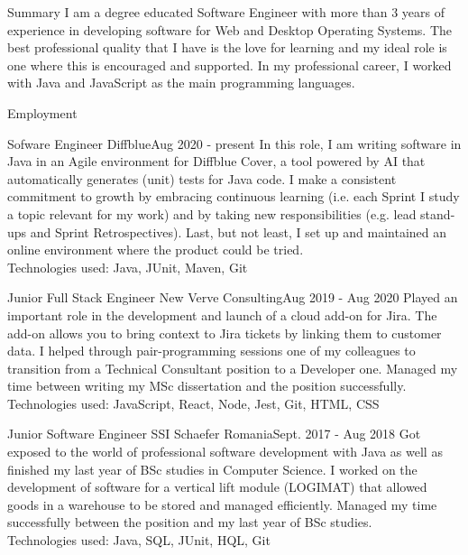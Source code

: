 \documentclass[]{mcdowellcv}
\begin{document}
	\makeheader

  \begin{cvsection}{Summary}
    I am a degree educated Software Engineer with more than 3 years of experience in developing software for Web and Desktop Operating Systems. The best professional quality that I have is the love for learning and my ideal role is one where this is encouraged and supported. In my professional career, I worked with Java and JavaScript as the main programming languages.
  \end{cvsection}

  \begin{cvsection}{Employment}
    \begin{cvsubsection}{Sofware Engineer }{Diffblue}{Aug 2020 - present}
      In this role, I am writing software in Java in an Agile environment for Diffblue Cover, a tool powered by AI that automatically generates (unit) tests for Java code. I make a consistent commitment to growth by embracing continuous learning (i.e. each Sprint I study a topic relevant for my work) and by taking new responsibilities (e.g. lead stand-ups and Sprint Retrospectives). Last, but not least, I set up and maintained an online environment where the product could be tried.
      \\Technologies used: Java, JUnit, Maven, Git
		\end{cvsubsection}

		\begin{cvsubsection}{Junior Full Stack Engineer }{New Verve Consulting}{Aug 2019 - Aug 2020}
      Played an important role in the development and launch of a cloud add-on for Jira. The add-on allows you to bring context to Jira tickets by linking them to customer data. I helped through pair-programming sessions one of my colleagues to transition from a Technical Consultant position to a Developer one. Managed my time between writing my MSc dissertation and the position successfully.
      \\Technologies used: JavaScript, React, Node, Jest, Git, HTML, CSS
		\end{cvsubsection}

		\begin{cvsubsection}{Junior Software Engineer }{SSI Schaefer Romania}{Sept. 2017 - Aug 2018}
      Got exposed to the world of professional software development with Java as well as finished my last year of BSc studies in Computer Science. I worked on the development of software for a vertical lift module (LOGIMAT) that allowed goods in a warehouse to be stored and managed efficiently. Managed my time successfully between the position and my last year of BSc studies.
      \\Technologies used: Java, SQL, JUnit, HQL, Git
		\end{cvsubsection}
		
  \end{cvsection}
\end{document}
